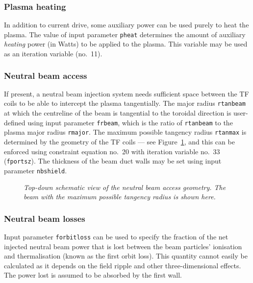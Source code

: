 \documentclass[11pt,a4paper]{report}
\begin{document}
\subsubsection{Plasma heating}

In addition to current drive, some auxiliary power can be used purely to heat
the plasma. The value of input parameter \texttt{pheat} determines the amount
of auxiliary \textit{heating}\/ power (in Watts) to be applied to the
plasma. This variable may be used as an iteration variable (no.\ 11).

\subsubsection{Neutral beam access}

If present, a neutral beam injection system needs sufficient space between the
TF coils to be able to intercept the plasma tangentially. The major radius
\texttt{rtanbeam} at which the centreline of the beam is tangential to the
toroidal direction is user-defined using input parameter \texttt{frbeam},
which is the ratio of \texttt{rtanbeam} to the plasma major radius
\texttt{rmajor}. The maximum possible tangency radius \texttt{rtanmax} is
determined by the geometry of the TF coils --- see Figure~\ref{fig:portsize},
and this can be enforced using constraint equation no.\ 20 with iteration
variable no.\ 33 (\texttt{fportsz}). The thickness of the beam duct walls may
be set using input parameter \texttt{nbshield}.

\begin{figure}[tbph]
\caption[Schematic diagram of the neutral beam access geometry]
{\label{fig:portsize}
  \textit{Top-down schematic view of the neutral beam access geometry. The beam
    with the maximum possible tangency radius is shown here.}
}
\end{figure}

\subsubsection{Neutral beam losses}

Input parameter \texttt{forbitloss} can be used to specify the fraction of the
net injected neutral beam power that is lost between the beam particles'
ionisation and thermalisation (known as the first orbit loss). This quantity cannot easily be calculated as it depends on the field ripple and other three-dimensional effects.  The power lost
is assumed to be absorbed by the first wall.
\end{document}
